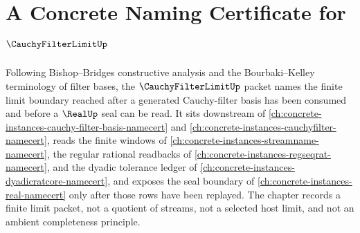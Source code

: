 \chapter{A Concrete Naming Certificate for $\CauchyFilterLimitUp$}
\label{ch:concrete-instances-cauchyfilterlimit-namecert}

Following Bishop--Bridges constructive analysis and the Bourbaki--Kelley terminology of filter bases, the $\CauchyFilterLimitUp$ packet names the finite limit boundary reached after a generated Cauchy-filter basis has been consumed and before a $\RealUp$ seal can be read. It sits downstream of \autoref{ch:concrete-instances-cauchy-filter-basis-namecert} and \autoref{ch:concrete-instances-cauchyfilter-namecert}, reads the finite windows of \autoref{ch:concrete-instances-streamname-namecert}, the regular rational readbacks of \autoref{ch:concrete-instances-regseqrat-namecert}, and the dyadic tolerance ledger of \autoref{ch:concrete-instances-dyadicratcore-namecert}, and exposes the seal boundary of \autoref{ch:concrete-instances-real-namecert} only after those rows have been replayed. The chapter records a finite limit packet, not a quotient of streams, not a selected host limit, and not an ambient completeness principle.

